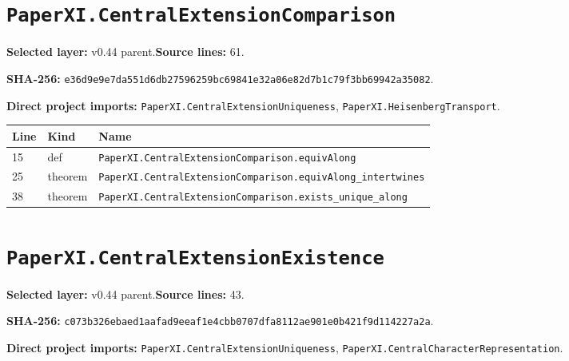 \documentclass[10pt,oneside]{book}
\begin{document}
\section{\texorpdfstring{\nolinkurl{PaperXI.CentralExtensionComparison}}{PaperXI.CentralExtensionComparison}}\label{module:PaperXI.CentralExtensionComparison}

\textbf{Selected layer:} v0.44 parent.\quad\textbf{Source lines:} 61.\par\textbf{SHA-256:} {\scriptsize\nolinkurl{e36d9e9e7da551d6db27596259bc69841e32a06e82d7b1c79f3bb69942a35082}}.


\textbf{Direct project imports:} \nolinkurl{PaperXI.CentralExtensionUniqueness}, \nolinkurl{PaperXI.HeisenbergTransport}.

\begin{longtable}{@{}p{}p{}p{}@{}}\toprule Line&Kind&Name\\\midrule\endhead

15&def&\nolinkurl{PaperXI.CentralExtensionComparison.equivAlong}\\

25&theorem&\nolinkurl{PaperXI.CentralExtensionComparison.equivAlong_intertwines}\\

38&theorem&\nolinkurl{PaperXI.CentralExtensionComparison.exists_unique_along}\\

\bottomrule\end{longtable}

\section{\texorpdfstring{\nolinkurl{PaperXI.CentralExtensionExistence}}{PaperXI.CentralExtensionExistence}}\label{module:PaperXI.CentralExtensionExistence}

\textbf{Selected layer:} v0.44 parent.\quad\textbf{Source lines:} 43.\par\textbf{SHA-256:} {\scriptsize\nolinkurl{c073b326ebaed1aafad9eeaf1e4cbb0707dfa8112ae901e0b421f9d114227a2a}}.


\textbf{Direct project imports:} \nolinkurl{PaperXI.CentralExtensionUniqueness}, \nolinkurl{PaperXI.CentralCharacterRepresentation}.
\end{document}
